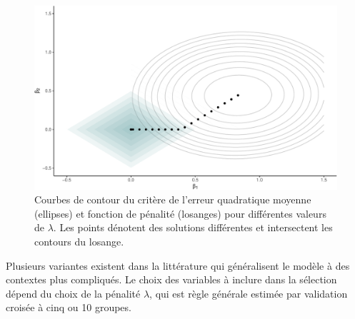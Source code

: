 \documentclass[
  11pt,
  letterpaper,
]{book}
\theoremstyle{definition}
\theoremstyle{remark}
\begin{document}
\begin{figure}[ht!]

{\centering \includegraphics[width=1\textwidth,height=\textheight]{./04-selectionmodeles_files/figure-pdf/fig-lassopenalty-1.pdf}

}

\caption{\label{fig-lassopenalty}Courbes de contour du critère de
l'erreur quadratique moyenne (ellipses) et fonction de pénalité
(losanges) pour différentes valeurs de \(\lambda\). Les points dénotent
des solutions différentes et intersectent les contours du losange.}

\end{figure}

Plusieurs variantes existent dans la littérature qui généralisent le
modèle à des contextes plus compliqués. Le choix des variables à inclure
dans la sélection dépend du choix de la pénalité \(\lambda\), qui est
règle générale estimée par validation croisée à cinq ou 10 groupes.
\end{document}
